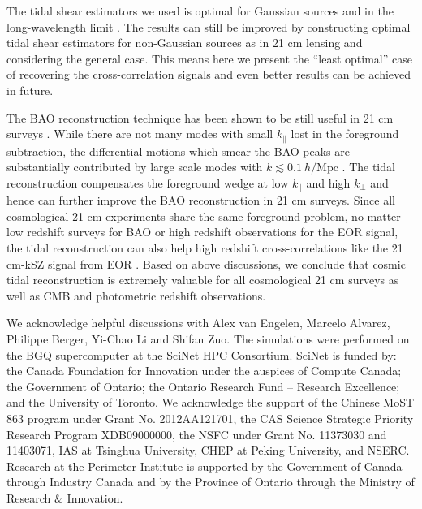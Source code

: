 \documentclass[aps,prl,twocolumn,showpacs,superscriptaddress,groupedaddress,nofootinbib,floatfix]{revtex4}  %
\newcommand{\mr}{\mathrm}
\begin{document}
The tidal shear estimators we used is optimal for Gaussian sources and in the 
long-wavelength limit \cite{2015:zhu}.
The results can still be improved by constructing optimal tidal shear 
estimators for non-Gaussian sources as in 21 cm lensing \cite{2010:lu} and 
considering the general case. This means here we present the ``least optimal''
case of recovering the cross-correlation signals and even better results can be
achieved in future.

The BAO reconstruction technique \cite{2007:bao} has been shown to be still
useful in 21 cm surveys \cite{2015:bao1,2015:bao2}. While there are not 
many modes with small $k_\parallel$ lost in the foreground subtraction, the 
differential motions which smear the BAO peaks are substantially contributed
by large scale modes with $k\lesssim0.1\ h/\mr{Mpc}$ \cite{2007:bao}.
The tidal reconstruction compensates the foreground wedge at low $k_\parallel$
and high $k_\perp$ and hence can further improve the BAO reconstruction in 21 cm
surveys. Since all cosmological 21 cm experiments share the same foreground
problem, no matter low redshift surveys for BAO or high redshift observations
for the EOR signal, the tidal reconstruction can also help high redshift 
cross-correlations like the 21 cm-kSZ signal from EOR \cite{2015:marcelo}. Based
on above discussions, we conclude that cosmic tidal reconstruction is extremely
valuable for all cosmological 21 cm surveys as well as CMB and photometric
redshift observations.

We acknowledge helpful discussions with Alex van Engelen, Marcelo Alvarez,
Philippe Berger, Yi-Chao Li and Shifan Zuo.
The simulations were performed on the BGQ supercomputer 
at the SciNet HPC Consortium.
SciNet is funded by: the Canada Foundation for Innovation under the auspices 
of Compute Canada;
the Government of Ontario; the Ontario Research Fund -- Research Excellence;
and the University of Toronto.
We acknowledge the support of the Chinese MoST 863 program under Grant 
No. 2012AA121701, the CAS Science Strategic Priority Research Program 
XDB09000000, the NSFC under Grant No. 11373030 and 11403071, IAS at 
Tsinghua University, CHEP at Peking University, and NSERC.
Research at the Perimeter Institute is supported by the Government of Canada 
through Industry Canada and by the Province of Ontario through the Ministry of 
Research $\&$ Innovation.



\end{document}
